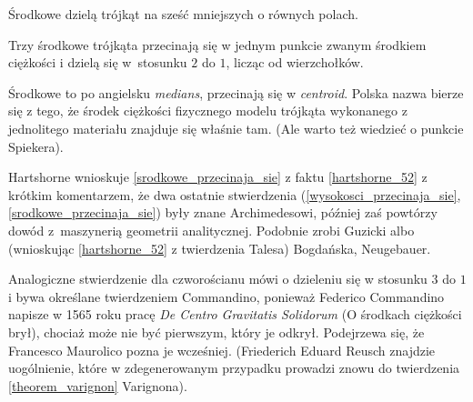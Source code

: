 Środkowe dzielą trójkąt na sześć mniejszych o równych polach.

\begin{proposition}
\label{srodkowe_przecinaja_sie}%
%
    Trzy środkowe trójkąta przecinają się w jednym punkcie zwanym środkiem ciężkości i dzielą się w~stosunku $2$ do $1$, licząc od wierzchołków.
\end{proposition}

Środkowe to po angielsku \emph{medians}, przecinają się w \emph{centroid}.
Polska nazwa bierze się z tego, że środek ciężkości fizycznego modelu trójkąta wykonanego z jednolitego materiału znajduje się właśnie tam.
(Ale warto też wiedzieć o punkcie Spiekera).

Hartshorne \cite[s. 52-54]{hartshorne2000} wnioskuje \ref{srodkowe_przecinaja_sie} z faktu \ref{hartshorne_52} z krótkim komentarzem, że dwa ostatnie stwierdzenia (\ref{wysokosci_przecinaja_sie}, \ref{srodkowe_przecinaja_sie}) były znane Archimedesowi, później zaś \cite[s. 119-120]{hartshorne2000} powtórzy dowód z~maszynerią geometrii analitycznej.
%
Podobnie zrobi Guzicki \cite[s. 220]{guzicki_2021} albo (wnioskując \ref{hartshorne_52} z twierdzenia Talesa) Bogdańska, Neugebauer.
%

Analogiczne stwierdzenie dla czworościanu mówi o dzieleniu się w stosunku $3$ do $1$ i bywa określane twierdzeniem Commandino, ponieważ Federico Commandino napisze w 1565 roku pracę \emph{De Centro Gravitatis Solidorum} (O środkach ciężkości brył), chociaż może nie być pierwszym, który je odkrył.
%
%
Podejrzewa się, że Francesco Maurolico pozna je wcześniej.
(Friederich Eduard Reusch znajdzie uogólnienie, które w zdegenerowanym przypadku prowadzi znowu do twierdzenia \ref{theorem_varignon} Varignona).